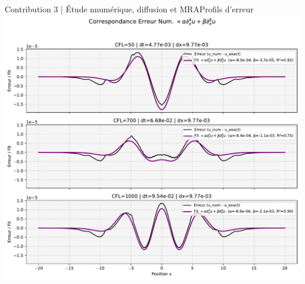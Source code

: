 \begin{frame}{Contribution 3 | Étude nnumérique, diffusion et MRA}{Profils d'erreur}
    \centering
    \includegraphics[height= .85\textheight]{medias/2_/3_/derivees_spatiales_VS_err_num.pdf}
    
\end{frame}